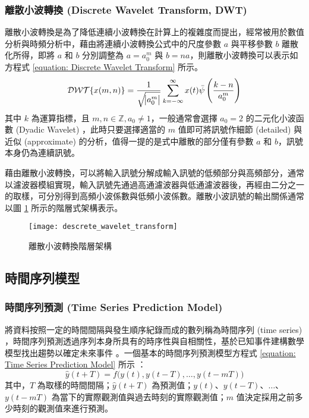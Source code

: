 \subsubsection{離散小波轉換 (Discrete Wavelet Transform, DWT)}

離散小波轉換是為了降低連續小波轉換在計算上的複雜度而提出，經常被用於數值分析與時頻分析中，藉由將連續小波轉換公式中的尺度參數 $a$ 與平移參數 $b$ 離散化所得，即將 $a$ 和 $b$ 分別調整為 $a = a_{0}^{m}$ 與 $b = na$，則離散小波轉換可以表示如方程式 \eqref{equation: Discrete Wavelet Transform} 所示。
%
\begin{equation}\label{equation: Discrete Wavelet Transform}
  \mathcal{DWT}\{ x(m, n) \} = \frac{1}{\sqrt{\abs{a_{0}^m}}} \sum_{k=-\infty}^{\infty} x(t) \bar{\psi} \left( \frac{k - n}{a_{0}^m} \right)
\end{equation}
%
其中 $k$ 為運算指標，且 $m, n \in \mathbb{Z}, a_{0} \neq 1$，一般通常會選擇 $a_0 = 2$ 的二元化小波函數 (Dyadic Wavelet) ，此時只要選擇適當的 $m$ 值即可將訊號作細節 (detailed) 與近似 (approximate) 的分析，值得一提的是式中離散的部分僅有參數 $a$ 和 $b$，訊號本身仍為連續訊號。

藉由離散小波轉換，可以將輸入訊號分解成輸入訊號的低頻部分與高頻部分，通常以濾波器模組實現，輸入訊號先通過高通濾波器與低通濾波器後，再經由二分之一的取樣，可分別得到高頻小波係數與低頻小波係數。離散小波訊號的輸出關係通常以圖 \ref{figure: Descrete Wavelet Transform} 所示的階層式架構表示。
%
\begin{figure}[htbp]
  \centering
  \texttt{[image: descrete\_wavelet\_transform]}
  \caption{離散小波轉換階層架構}
  \label{figure: Descrete Wavelet Transform}
\end{figure}
%
\subsection{時間序列模型}

\subsubsection{時間序列預測 (Time Series Prediction Model)}

將資料按照一定的時間間隔與發生順序紀錄而成的數列稱為時間序列 (time series) ，時間序列預測透過序列本身所具有的時序性與自相關性，基於已知事件建構數學模型找出趨勢以確定未來事件 \cite{Wang2012}。一個基本的時間序列預測模型方程式 \eqref{equation: Time Series Prediction Model} 所示 \cite{box2015time}：
\begin{equation}\label{equation: Time Series Prediction Model}
  \hat{y} (t + T) = f\Big( y(t), y(t - T), \dots, y(t - mT) \Big)
\end{equation}
%
其中，$T$ 為取樣的時間間隔；$\hat{y}(t + T)$ 為預測值；$y(t)$、$y(t - T)$、$\dots$、$y(t - mT)$ 為當下的實際觀測值與過去時刻的實際觀測值；$m$ 值決定採用之前多少時刻的觀測值來進行預測。

